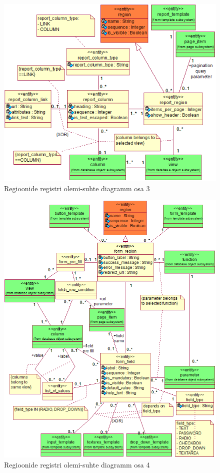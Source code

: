 \documentclass[a4paper,12pt]{article} %
\begin{document}
\begin{figure}[H]
\centering
\includegraphics[width=\textwidth]{./diagrams/report-region-er-diagram.png}
\caption{Regioonide registri olemi-suhte diagramm osa 3}
\label{fig_raportite_regioonide_registri_olemi_suhte_diagramm}
\end{figure}

\begin{figure}[H]
\centering
\includegraphics[width=\textwidth]{./diagrams/form-region-er-diagram.png}
\caption{Regioonide registri olemi-suhte diagramm osa 4}
\label{fig_vormide_regioonide_registri_olemi_suhte_diagramm}
\end{figure}
\end{document}
